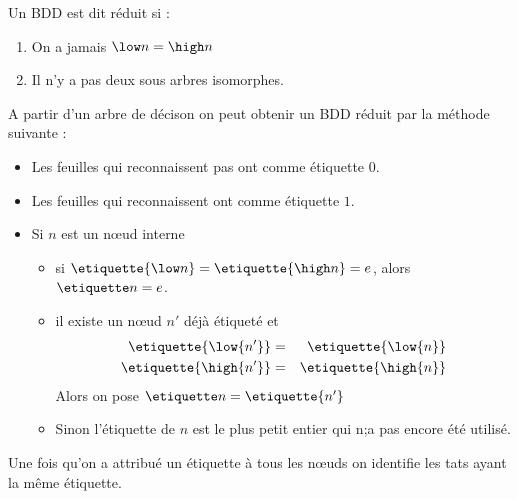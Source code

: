 \begin{definition}
	Un BDD est dit réduit si :
	\begin{enumerate}
		\item On a jamais $\low n = \high n$
		\item Il n'y a pas deux sous arbres isomorphes.
	\end{enumerate}
\end{definition}

A partir d'un arbre de décison on peut obtenir un BDD réduit par la méthode suivante :
\begin{itemize}
	\item Les feuilles qui reconnaissent pas ont comme étiquette $0$.
	\item Les feuilles qui reconnaissent ont comme étiquette $1$.
	\item Si $n$ est un nœud interne
	      \begin{itemize}
		      \item si $\etiquette {\low n} = \etiquette {\high n} = e$, alors $\etiquette n = e$.
		      \item il existe un nœud $n'$ déjà étiqueté et \tq
		            \begin{eqnarray*}
			            \etiquette {\low {n'}} &=& \etiquette {\low {n}} \\
			            \etiquette {\high{n'}} &=& \etiquette {\high{n}}
		            \end{eqnarray*}
		            Alors on pose $\etiquette n = \etiquette {n'}$
		      \item Sinon l'étiquette de $n$ est le plus petit entier qui n;a pas encore été utilisé.
	      \end{itemize}
\end{itemize}

Une fois qu'on a attribué un étiquette à tous les nœuds on identifie les tats ayant la même étiquette.



